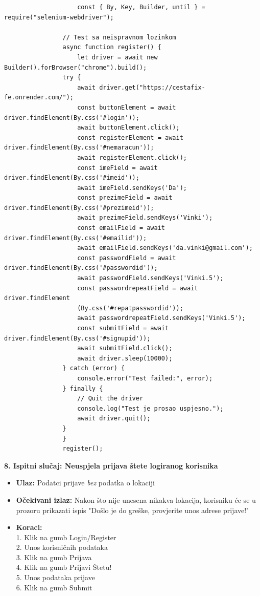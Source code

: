 			\begin{verbatim}
					const { By, Key, Builder, until } = require("selenium-webdriver");

				// Test sa neispravnom lozinkom
				async function register() {
					let driver = await new Builder().forBrowser("chrome").build();
				try {
					await driver.get("https://cestafix-fe.onrender.com/");
					const buttonElement = await driver.findElement(By.css('#login'));
					await buttonElement.click();
					const registerElement = await driver.findElement(By.css('#nemaracun'));
					await registerElement.click();
					const imeField = await driver.findElement(By.css('#imeid'));
					await imeField.sendKeys('Da');
					const prezimeField = await driver.findElement(By.css('#prezimeid'));
					await prezimeField.sendKeys('Vinki');
					const emailField = await driver.findElement(By.css('#emailid'));
					await emailField.sendKeys('da.vinki@gmail.com');
					const passwordField = await driver.findElement(By.css('#passwordid'));
					await passwordField.sendKeys('Vinki.5');
					const passwordrepeatField = await driver.findElement
					(By.css('#repatpasswordid'));
					await passwordrepeatField.sendKeys('Vinki.5');
					const submitField = await driver.findElement(By.css('#signupid'));
					await submitField.click();
					await driver.sleep(10000);
				} catch (error) {
					console.error("Test failed:", error);
				} finally {
					// Quit the driver
					console.log("Test je prosao uspjesno.");
					await driver.quit();
				}
				}
				register();
			\end{verbatim}

			\textbf{8. Ispitni slučaj: Neuspjela prijava štete logiranog korisnika}
			 \begin{itemize}
				\item \textbf{Ulaz:} Podatci prijave \textit{bez} podatka o lokaciji
				\item \textbf{Očekivani izlaz:} Nakon što nije unesena nikakva lokacija, korisniku će se u prozoru prikazati ispis "Došlo je do greške, provjerite unos adrese prijave!"
				\item \textbf{Koraci:} 
				\\ 1. Klik na gumb Login/Register
				\\ 2. Unos korisničnih podataka
				\\ 3. Klik na gumb Prijava
				\\ 4. Klik na gumb Prijavi Štetu!
				\\ 5. Unos podataka prijave
				\\ 6. Klik na gumb Submit
			\end{itemize}

